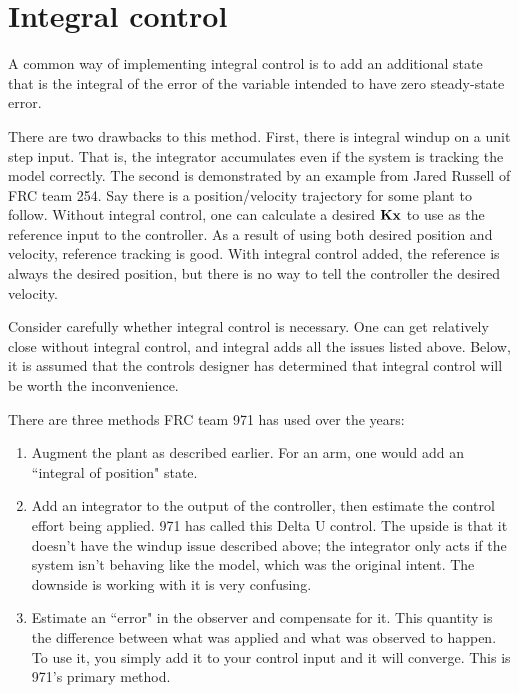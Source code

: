 \section{Integral control}

A common way of implementing integral control is to add an additional state that
is the integral of the error of the variable intended to have zero steady-state
error.

There are two drawbacks to this method. First, there is integral windup on a
unit step input. That is, the integrator accumulates even if the system is
tracking the model correctly. The second is demonstrated by an example from
Jared Russell of FRC team 254. Say there is a position/velocity trajectory for
some plant to follow. Without integral control, one can calculate a desired
$\mathbf{K}\mathbf{x}$ to use as the reference input to the controller. As a result of
using both desired position and velocity, reference tracking is good. With
integral control added, the reference is always the desired position, but there
is no way to tell the controller the desired velocity.

Consider carefully whether integral control is necessary. One can get relatively
close without integral control, and integral adds all the issues listed above.
Below, it is assumed that the controls designer has determined that integral
control will be worth the inconvenience.

There are three methods FRC team 971 has used over the years:

\begin{enumerate}
  \item Augment the plant as described earlier. For an arm, one would add an
    ``integral of position" state.
  \item Add an integrator to the output of the controller, then estimate the
    control effort being applied. 971 has called this Delta U control. The
    upside is that it doesn't have the windup issue described above; the
    integrator only acts if the system isn't behaving like the model, which was
    the original intent. The downside is working with it is very confusing.
  \item Estimate an ``error" in the observer and compensate for it. This
    quantity is the difference between what was applied and what was observed to
    happen. To use it, you simply add it to your control input and it will
    converge. This is 971's primary method.
\end{enumerate}

